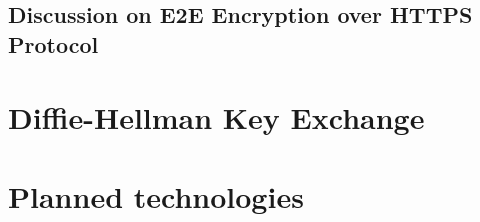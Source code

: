 \subsection{Discussion on E2E Encryption over HTTPS Protocol}\label{subsec:discussion-on-e2e-encryption-over-https-protocol}


\section{Diffie-Hellman Key Exchange}\label{sec:diffie-hellman-key-exchange}



\section{Planned technologies}\label{sec:planned-technologies}
